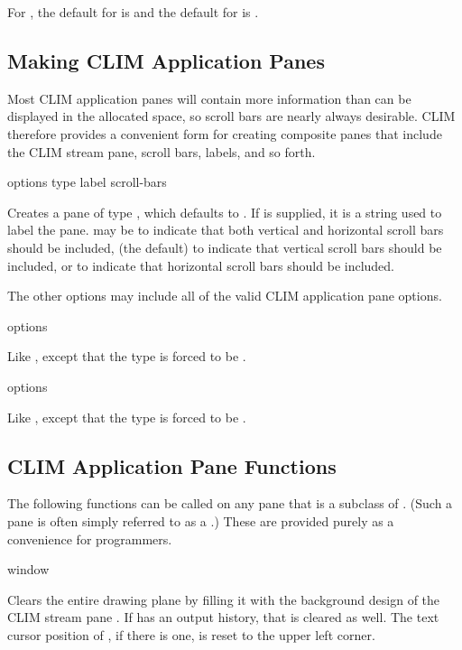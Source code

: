 For , the default for  is
 and the default for  is .


\subsection {Making CLIM Application Panes}

Most CLIM application panes will contain more information than can be displayed
in the allocated space, so scroll bars are nearly always desirable.  CLIM
therefore provides a convenient form for creating composite panes that include
the CLIM stream pane, scroll bars, labels, and so forth.

 {\rest options \key type label scroll-bars \allow}

Creates a pane of type , which defaults to .  If
 is supplied, it is a string used to label the pane.
 may be  to indicate that both vertical and horizontal
scroll bars should be included,  (the default) to indicate that
vertical scroll bars should be included, or  to indicate that
horizontal scroll bars should be included.

The other options may include all of the valid CLIM application pane options.

 {\rest options}

Like , except that the type is forced to be
.

 {\rest options}

Like , except that the type is forced to be
.


\subsection {CLIM Application Pane Functions}

The following functions can be called on any pane that is a subclass of
.  (Such a pane is often simply referred to as a
.)  These are provided purely as a convenience for programmers.

 {window}

Clears the entire drawing plane by filling it with the background design of the
CLIM stream pane .  If  has an output history, that is
cleared as well.  The text cursor position of , if there is one, is
reset to the upper left corner.

